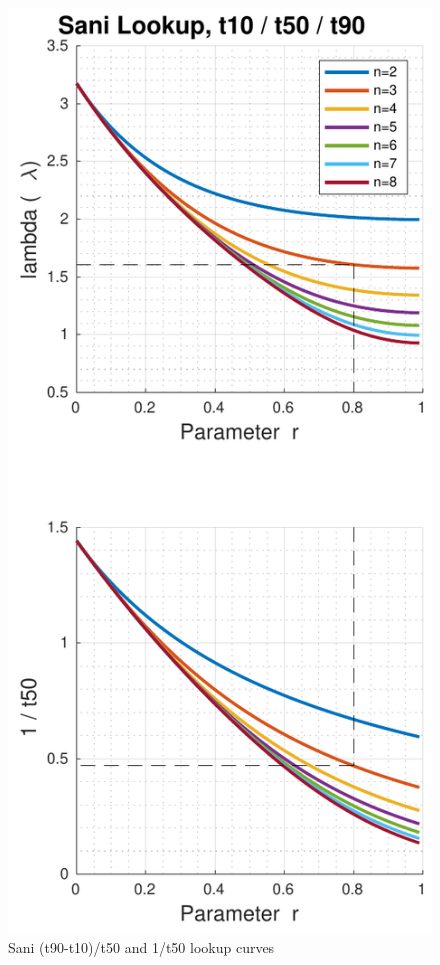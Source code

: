 \begin{figure}
    \includegraphics[width=\linewidth]{images/sani_curves_t10_t50_t90}
    \caption{Sani (t90-t10)/t50 and 1/t50 lookup curves}
    \label{fig:sani_t3}
\end{figure}

